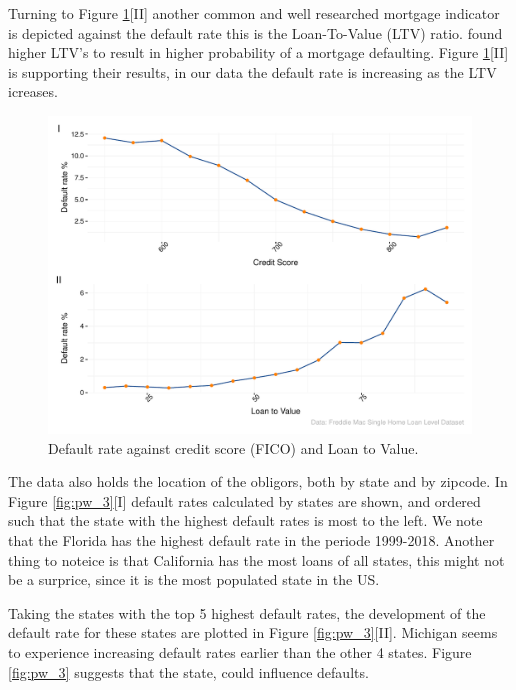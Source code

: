 Turning to Figure \ref{fig:pw_2}[II] another common and well researched mortgage indicator is depicted against the default rate this is the Loan-To-Value (LTV) ratio. \cite{Ambrose_1998} found higher LTV's to result in higher probability of a mortgage defaulting. Figure \ref{fig:pw_2}[II] is supporting their results, in our data the default rate is increasing as the LTV icreases.  

\begin{figure}[H]
    \centering
    \includegraphics[width = \textwidth]{Figures/pw_2.pdf}
    \caption{Default rate against credit score (FICO) and Loan to Value.}
    \label{fig:pw_2}
\end{figure}

The data also holds the location of the obligors, both by state and by zipcode. In Figure \ref{fig:pw_3}[I] default rates calculated by states are shown, and ordered such that the state with the highest default rates is most to the left. We note that the Florida has the highest default rate in the periode 1999-2018. Another thing to noteice is that California has the most loans of all states, this might not be a surprice, since it is the most populated state in the US. 

Taking the states with the top 5 highest default rates, the development of the default rate for these states are plotted in Figure \ref{fig:pw_3}[II]. Michigan seems to experience increasing default rates earlier than the other 4 states. Figure \ref{fig:pw_3} suggests that the state, could influence defaults. 

